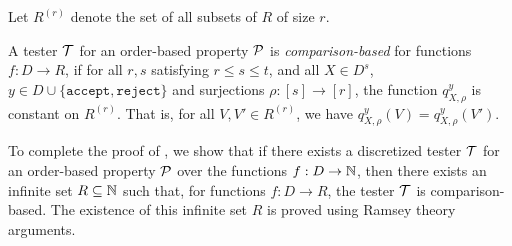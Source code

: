 \noindent Let $R^{(r)}$ denote the set of all subsets of $R$ of size $r$.

\begin{definition} \label{def:cbt}
A tester ${\cal T}$ for an order-based property $\mathcal{P}$ is {\em comparison-based} for functions $f:D \to R$, if for all $r,s$ satisfying $ r \leq s \leq t$, and all $X \in D^s$, $y \in D \cup \{\texttt{accept}, \texttt{reject}\}$ and surjections $\rho:[s] \to [r]$, the function $q_{X,\rho}^y$ is constant on $R^{(r)}$. That is, for all $V, V' \in R^{(r)}$, we have $q_{X,\rho}^y(V) = q_{X,\rho}^y(V')$.
\end{definition}


%

\noindent To complete the proof of , we show that if there exists a discretized tester ${\cal T}$ for an order-based property $\mathcal{P}$ over the functions $f:D \to \mathbb N$, then there exists an infinite set $R \subseteq \mathbb N$ such that, for functions $f:D \to R$, the tester ${\cal T}$ is comparison-based.
The existence of this infinite set $R$ is proved using Ramsey theory arguments.

